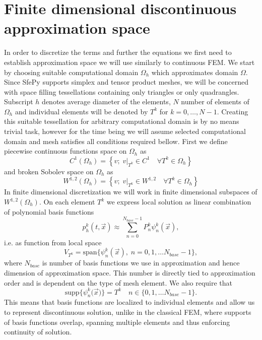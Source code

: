 \section{Finite dimensional discontinuous approximation space}
In order to discretize the terms and further the equations we first need to 
establish approximation space we will use similarly to continuous FEM. We start 
by choosing suitable computational domain $\Omega_h$ which approximates domain 
$\Omega$. Since SfePy supports simplex and tensor product meshes, we will be 
concerned with space filling tessellations containing only triangles or 
only quadrangles. Subscript $h$ denotes average diameter of the elements, $N$ 
number of elements of $\Omega_h$ and individual elements will be denoted by 
$T^k$ for $k=0, \ldots, N - 1$. Creating this suitable tessellation for 
arbitrary computational domain is by no means trivial task, however for the 
time being we will assume selected computational domain and mesh satisfies all 
conditions required bellow. First we define piecewise continuous functions 
space on $\Omega_h$ as 
\begin{equation}
	C^1(\Omega_h) =  \left\{v;\; v\vert_{T^k} \in C^1 \quad \forall T^k \in 
	\Omega_h \right\}
\end{equation}
and broken Sobolev space on $\Omega_h$ as
\begin{equation}\label{eq:sobh}
	W^{1, 2}(\Omega_h) = \left\{v;\; v\vert_{T^k} \in W^{1, 2}\quad \forall T^k 
	\in \Omega_h \right\}
\end{equation}
In finite dimensional discretization we will work in finite dimensional 
subspaces of $W^{1, 2}(\Omega_h)$. On each element $T^k$ we express local 
solution as linear combination of polynomial basis functions
\begin{equation}
\label{eq:el_lin_comb}
	p_h^k(t, \vec{x}) \approx \sum\limits_{n=0}^{N_{base} - 1} 
	P_n^k\psi^k_n(\vec{x}),
\end{equation}
i.e. as function from local space
\begin{equation}
	V_{T^k} = \text{span}\big\{ \psi_n^k(\vec{x}), \; n = 0,1, \dots  
	N_{base}-1\big\},
\end{equation}
where $N_{base}$ is number of basis functions we use in approximation and hence 
dimension of approximation space. This number is directly tied to approximation 
order and is dependent on the type of mesh element. We also require that
\begin{equation}
	\text{supp}\big\{\psi_n^k(\vec{x}\big)\} = T^k \quad n \in \{0,1, 
	\dots  N_{base}-1\}.
\end{equation}
This means that basis functions are localized to individual elements and allow 
us to represent discontinuous solution, unlike in the classical FEM, where 
supports of basis functions overlap, spanning multiple elements and  thus 
enforcing continuity of solution.

